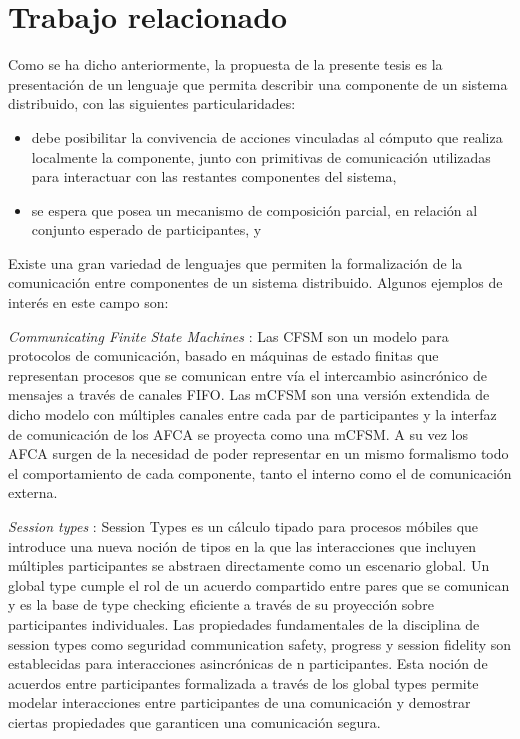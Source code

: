 \section*{Trabajo relacionado}
\label{trabajo-relacionado}
Como se ha dicho anteriormente, la propuesta de la presente tesis es la presentación de un lenguaje que permita describir una componente de un sistema distribuido, con las siguientes particularidades: 
\begin{itemize}
\item debe posibilitar la convivencia de acciones vinculadas al cómputo que realiza localmente la componente, junto con primitivas de comunicación utilizadas para interactuar con las restantes componentes del sistema,
\item se espera que posea un mecanismo de composición parcial, en relación al conjunto esperado de participantes, y
\end{itemize}

Existe una gran variedad de lenguajes que permiten la formalización de la comunicación entre componentes de un sistema distribuido. Algunos ejemplos de interés en este campo son:

\emph{Communicating Finite State Machines} \cite{brand:jacm-30_2}: Las CFSM son un modelo para protocolos de comunicación, basado en máquinas de estado finitas que representan procesos que se comunican entre vía el intercambio asincrónico de mensajes a través de canales FIFO. Las mCFSM son una versión extendida de dicho modelo con múltiples canales entre cada par de participantes y la interfaz de comunicación de los AFCA se proyecta como una mCFSM. A su vez los AFCA surgen de la necesidad de poder representar en un mismo formalismo todo el comportamiento de cada componente, tanto el interno como el de comunicación externa.

\emph{Session types} \cite{honda:esop98,honda:popl08}: Session Types es un cálculo tipado para procesos móbiles que introduce una nueva noción de tipos en la que las interacciones que incluyen múltiples participantes se abstraen directamente como un escenario global. Un global type cumple el rol de un acuerdo compartido entre pares que se comunican y es la base de type checking eficiente a través de su proyección sobre participantes individuales. Las propiedades fundamentales de la disciplina de session types como seguridad communication safety, progress y session fidelity son establecidas para interacciones asincrónicas de n participantes. Esta noción de acuerdos entre participantes formalizada a través de los global types permite modelar interacciones entre participantes de una comunicación y demostrar ciertas propiedades que garanticen una comunicación segura.


